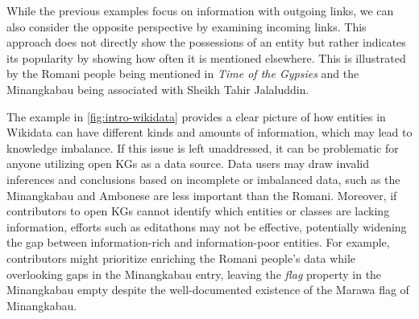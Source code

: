 While the previous examples focus on information with outgoing links, we can also consider the opposite perspective by examining incoming links. This approach does not directly show the possessions of an entity but rather indicates its popularity by showing how often it is mentioned elsewhere. This is illustrated by the Romani people being mentioned in \textit{Time of the Gypsies} and the Minangkabau being associated with Sheikh Tahir Jalaluddin.

The example in \autoref{fig:intro-wikidata} provides a clear picture of how entities in Wikidata can have different kinds and amounts of information, which may lead to knowledge imbalance. If this issue is left unaddressed, it can be problematic for anyone utilizing open KGs as a data source. Data users may draw invalid inferences and conclusions based on incomplete or imbalanced data, such as the Minangkabau and Ambonese are less important than the Romani. Moreover, if contributors to open KGs cannot identify which entities or classes are lacking information, efforts such as editathons may not be effective, potentially widening the gap between information-rich and information-poor entities. For example, contributors might prioritize enriching the Romani people's data while overlooking gaps in the Minangkabau entry, leaving the \textit{flag} property in the Minangkabau empty despite the well-documented existence of the Marawa flag of Minangkabau.



